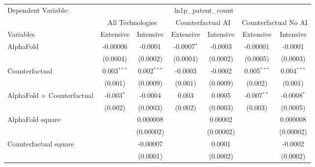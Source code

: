 \begingroup
\centering
\begin{tabular}{lcccccc}
   \tabularnewline \midrule \midrule
   Dependent Variable: & \multicolumn{6}{c}{ln1p\_patent\_count}\\
 & \multicolumn{2}{c}{All Technologies} & \multicolumn{2}{c}{Counterfactual AI} & \multicolumn{2}{c}{Counterfactual No AI} \\
\cmidrule(lr){1-1}\cmidrule(lr){2-3} \cmidrule(lr){4-5} \cmidrule(lr){6-7}
Variables & \multicolumn{1}{c}{Extensive} & \multicolumn{1}{c}{Intensive} & \multicolumn{1}{c}{Extensive} & \multicolumn{1}{c}{Intensive} & \multicolumn{1}{c}{Extensive} & \multicolumn{1}{c}{Intensive} \\
\cmidrule(lr){1-1}\cmidrule(lr){2-2} \cmidrule(lr){3-3} \cmidrule(lr){4-4} \cmidrule(lr){5-5} \cmidrule(lr){6-6} \cmidrule(lr){7-7}
   AlphaFold                          & -0.00006      & -0.0001       & -0.0007$^{*}$ & -0.0003         & -0.00001      & -0.0001\\   
                                      & (0.0004)      & (0.0002)      & (0.0004)      & (0.0002)        & (0.0005)      & (0.0003)\\   
   Counterfactual                     & 0.003$^{***}$ & 0.002$^{***}$ & -0.0003       & -0.0002         & 0.005$^{***}$ & 0.004$^{***}$\\   
                                      & (0.001)       & (0.0009)      & (0.001)       & (0.0009)        & (0.002)       & (0.001)\\   
   AlphaFold $\times$ Counterfactual  & -0.003$^{*}$  & -0.0004       & 0.003         & 0.0005          & -0.007$^{**}$ & -0.0008$^{*}$\\   
                                      & (0.002)       & (0.0003)      & (0.002)       & (0.0003)        & (0.003)       & (0.0005)\\   
   AlphaFold square                   &               & 0.000008      &               & 0.00002         &               & 0.000008\\   
                                      &               & (0.00002)     &               & (0.00002)       &               & (0.00002)\\   
   Counterfactual square              &               & -0.00007      &               & 0.0001          &               & -0.0002\\   
                                      &               & (0.0001)      &               & (0.0002)        &               & (0.0002)\\   

\end{tabular}
